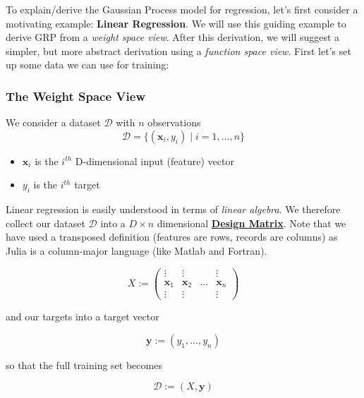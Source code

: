 To explain/derive the Gaussian Process model for regression, let's first consider a motivating example: \textbf{Linear Regression}. We will use this guiding example to derive GRP from a \textit{weight space view}. After this derivation, we will suggest a simpler, but more abstract derivation using a \textit{function space view}. First let's set up some data we can use for training:

\subsubsection{The Weight Space View}

We consider a dataset $\mathcal{D}$ with $n$ observations
\begin{equation}
  \mathcal{D} = \Big\{ (\mathbf{x}_i, y_i) \;\Big\vert \; i = 1,...,n\Big\}
\end{equation}

\begin{itemize}[noitemsep, nolistsep]
\item $\mathbf{x}_i$ is the $i^{th}$ D-dimensional input (feature) vector
\item $y_i$ is the $i^{th}$ target
\end{itemize}

Linear regression is easily understood in terms of \textit{linear algebra}. We therefore collect our dataset $\mathcal{D}$ into a $D \times n$ dimensional \href{https://en.wikipedia.org/wiki/Design_matrix}{\textbf{Design Matrix}}. Note that we have used a transposed definition (features are rows, records are columns) as Julia is a column-major language (like Matlab and Fortran).

\begin{equation}
  X := \begin{pmatrix}
    \vdots & \vdots & & \vdots \\
    \mathbf{x}_1 & \mathbf{x}_2 & ... & \mathbf{x}_n \\
    \vdots & \vdots & & \vdots
  \end{pmatrix}
\end{equation}

and our targets into a target vector

\begin{equation}
  \mathbf{y} := (y_1, ..., y_n)
\end{equation}

so that the full training set becomes

\begin{equation}
  \mathcal{D} := (X, \mathbf{y})
\end{equation}

